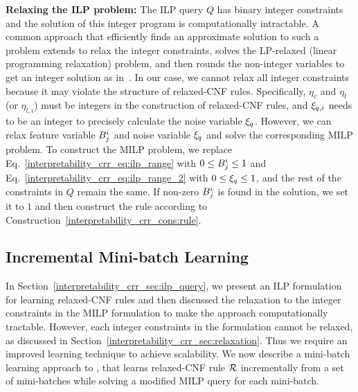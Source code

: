 

\textbf{Relaxing the ILP problem:}
\label{interpretability_crr_sec:relaxation}
The ILP query $ Q $ has binary integer constraints and the solution of this integer program is computationally intractable. 
A common approach that efficiently finds an approximate solution to such a problem extends to relax the integer constraints,  solves the LP-relaxed (linear programming relaxation) problem, and then rounds the non-integer variables to get an integer solution as in~\cite{MV2013}. 
In our case, we cannot relax all integer constraints because it may violate the structure of relaxed-CNF rules. Specifically, $ \eta_c $ and $ \eta_l $ (or $ \eta_{l,i} $) must be integers in the construction of relaxed-CNF rules, and $ \xi_{q,i} $ needs to be an integer to precisely calculate the noise variable $ \xi_q $.  However,  we can relax feature variable $ B^i_j $ and noise variable $ \xi_q $ and solve the corresponding MILP  problem.  To construct the MILP problem, we replace Eq.~\ref{interpretability_crr_eq:ilp_range} with $ 0 \le B^i_j \le 1 $ and Eq.~\ref{interpretability_crr_eq:ilp_range_2} with $ 0 \le \xi_q \le 1 $, and the rest of the constraints in $ Q $ remain the same.  If non-zero $ B^i_j $ is found in the solution, we set it to $ 1 $ and then construct the rule according to Construction~\ref{interpretability_crr_cons:rule}.






	



\subsection{Incremental Mini-batch Learning}
\label{interpretability_crr_sec:inc_ilp}

In Section~\ref{interpretability_crr_sec:ilp_query}, we  present an ILP formulation for learning relaxed-CNF rules and then discussed the relaxation to the integer constraints in the MILP formulation to make the approach computationally tractable. However, each integer constraints in the formulation cannot be relaxed, as discussed  in Section~\ref{interpretability_crr_sec:relaxation}. Thus we require an improved learning technique to achieve scalability. We now describe a mini-batch learning approach to {\crr}, that learns relaxed-CNF rule $ {\mathcal{R}} $ incrementally from a set of mini-batches while solving a modified MILP query for each mini-batch.



